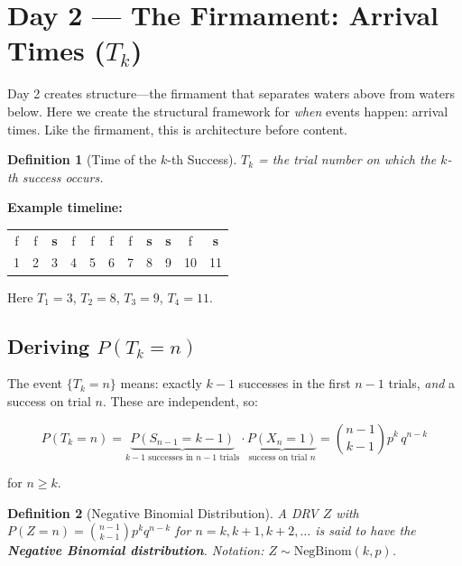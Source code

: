 \documentclass[11pt]{article}
\newtheorem{definition}{Definition}
\begin{document}
\section{Day 2 --- The Firmament: Arrival Times ($T_k$)}

\begin{creationbox}
Day 2 creates structure---the firmament that separates waters above from waters below. Here we create the structural framework for \emph{when} events happen: arrival times. Like the firmament, this is architecture before content.
\end{creationbox}

\begin{definition}[Time of the $k$-th Success]
$T_k$ = the trial number on which the $k$-th success occurs.
\end{definition}

\textbf{Example timeline:}
\begin{center}
\begin{tabular}{ccccccccccc}
f & f & \textbf{s} & f & f & f & f & \textbf{s} & \textbf{s} & f & \textbf{s} \\
1 & 2 & 3 & 4 & 5 & 6 & 7 & 8 & 9 & 10 & 11
\end{tabular}
\end{center}
Here $T_1 = 3$, $T_2 = 8$, $T_3 = 9$, $T_4 = 11$.

\subsection{Deriving $P(T_k = n)$}

The event $\{T_k = n\}$ means: exactly $k-1$ successes in the first $n-1$ trials, \emph{and} a success on trial $n$. These are independent, so:

\[
\boxed{P(T_k = n) = \underbrace{P(S_{n-1} = k-1)}_{\text{$k-1$ successes in $n-1$ trials}} \cdot \underbrace{P(X_n = 1)}_{\text{success on trial } n} = \binom{n-1}{k-1} p^k \, q^{n-k}}
\]

for $n \geq k$.

\begin{definition}[Negative Binomial Distribution]
A DRV $Z$ with $P(Z = n) = \binom{n-1}{k-1} p^k q^{n-k}$ for $n = k, k+1, k+2, \ldots$ is said to have the \textbf{Negative Binomial distribution}. Notation: $Z \sim \text{NegBinom}(k, p)$.
\end{definition}
\end{document}
